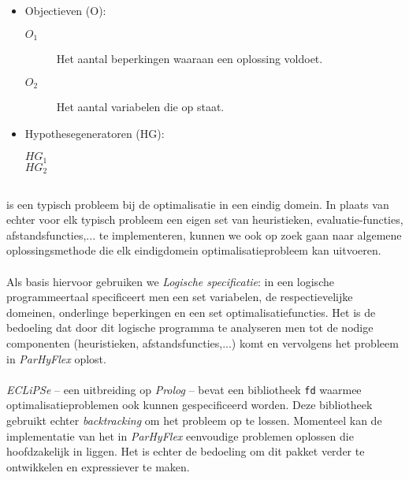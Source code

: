 \begin{itemize}
\item Objectieven (O):
\begin{description}
 \item [$O_1$] Het aantal beperkingen waaraan een oplossing voldoet.
 \item [$O_2$] Het aantal variabelen die op \true{} staat.
\end{description}
\item Hypothesegeneratoren (HG):
\begin{description}
 \item [$HG_1$] 
 \item [$HG_2$] 
\end{description}
\end{itemize}


\subsection{}

 is een typisch probleem bij de optimalisatie in een eindig domein. In plaats van echter voor elk typisch probleem een eigen set van heuristieken, evaluatie-functies, afstandsfuncties,... te implementeren, kunnen we ook op zoek gaan naar algemene oplossingsmethode die elk eindigdomein optimalisatieprobleem kan uitvoeren.

\paragraph{}
Als basis hiervoor gebruiken we \emph{Logische specificatie}: in een logische programmeertaal specificeert men een set variabelen, de respectievelijke domeinen, onderlinge beperkingen en een set optimalisatiefuncties. Het is de bedoeling dat door dit logische programma te analyseren men tot de nodige componenten (heuristieken, afstandsfuncties,...) komt en vervolgens het probleem in \emph{ParHyFlex} oplost.

\paragraph{}
\emph{ECLiPSe} -- een uitbreiding op \emph{Prolog} -- bevat een bibliotheek \texttt{fd} waarmee optimalisatieproblemen ook kunnen gespecificeerd worden. Deze bibliotheek gebruikt echter \emph{backtracking} om het probleem op te lossen. Momenteel kan de implementatie van het  in \emph{ParHyFlex} eenvoudige problemen oplossen die hoofdzakelijk in  liggen. Het is echter de bedoeling om dit pakket verder te ontwikkelen en expressiever te maken.

